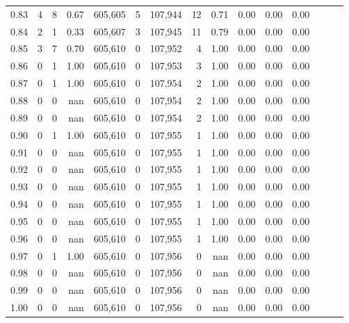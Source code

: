 \begin{tabular}{rrrrrrrrrrrrrrr}
0.83 &       4 &      8 &  0.67 &  605,605 &        5 &  107,944 &       12 &  0.71 &  0.00 &  0.00 &      0.00 \\
0.84 &       2 &      1 &  0.33 &  605,607 &        3 &  107,945 &       11 &  0.79 &  0.00 &  0.00 &      0.00 \\
0.85 &       3 &      7 &  0.70 &  605,610 &        0 &  107,952 &        4 &  1.00 &  0.00 &  0.00 &      0.00 \\
0.86 &       0 &      1 &  1.00 &  605,610 &        0 &  107,953 &        3 &  1.00 &  0.00 &  0.00 &      0.00 \\
0.87 &       0 &      1 &  1.00 &  605,610 &        0 &  107,954 &        2 &  1.00 &  0.00 &  0.00 &      0.00 \\
0.88 &       0 &      0 &   nan &  605,610 &        0 &  107,954 &        2 &  1.00 &  0.00 &  0.00 &      0.00 \\
0.89 &       0 &      0 &   nan &  605,610 &        0 &  107,954 &        2 &  1.00 &  0.00 &  0.00 &      0.00 \\
0.90 &       0 &      1 &  1.00 &  605,610 &        0 &  107,955 &        1 &  1.00 &  0.00 &  0.00 &      0.00 \\
0.91 &       0 &      0 &   nan &  605,610 &        0 &  107,955 &        1 &  1.00 &  0.00 &  0.00 &      0.00 \\
0.92 &       0 &      0 &   nan &  605,610 &        0 &  107,955 &        1 &  1.00 &  0.00 &  0.00 &      0.00 \\
0.93 &       0 &      0 &   nan &  605,610 &        0 &  107,955 &        1 &  1.00 &  0.00 &  0.00 &      0.00 \\
0.94 &       0 &      0 &   nan &  605,610 &        0 &  107,955 &        1 &  1.00 &  0.00 &  0.00 &      0.00 \\
0.95 &       0 &      0 &   nan &  605,610 &        0 &  107,955 &        1 &  1.00 &  0.00 &  0.00 &      0.00 \\
0.96 &       0 &      0 &   nan &  605,610 &        0 &  107,955 &        1 &  1.00 &  0.00 &  0.00 &      0.00 \\
0.97 &       0 &      1 &  1.00 &  605,610 &        0 &  107,956 &        0 &   nan &  0.00 &  0.00 &      0.00 \\
0.98 &       0 &      0 &   nan &  605,610 &        0 &  107,956 &        0 &   nan &  0.00 &  0.00 &      0.00 \\
0.99 &       0 &      0 &   nan &  605,610 &        0 &  107,956 &        0 &   nan &  0.00 &  0.00 &      0.00 \\
1.00 &       0 &      0 &   nan &  605,610 &        0 &  107,956 &        0 &   nan &  0.00 &  0.00 &      0.00 \\
\bottomrule
\end{tabular}
